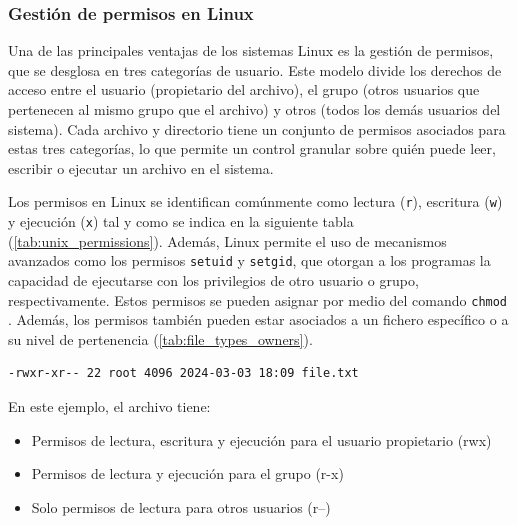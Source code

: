 
\subsubsection*{Gestión de permisos en Linux}

Una de las principales ventajas de los sistemas Linux es la gestión de permisos, que se desglosa en tres categorías de usuario. Este modelo divide los derechos de acceso entre el usuario (propietario del archivo), el grupo (otros usuarios que pertenecen al mismo grupo que el archivo) y otros (todos los demás usuarios del sistema). Cada archivo y directorio tiene un conjunto de permisos asociados para estas tres categorías, lo que permite un control granular sobre quién puede leer, escribir o ejecutar un archivo en el sistema.

Los permisos en Linux se identifican comúnmente como lectura (\texttt{r}), escritura (\texttt{w}) y ejecución (\texttt{x}) tal y como se indica en la siguiente tabla (\ref{tab:unix_permissions}). Además, Linux permite el uso de mecanismos avanzados como los permisos \texttt{setuid} y \texttt{setgid}, que otorgan a los programas la capacidad de ejecutarse con los privilegios de otro usuario o grupo, respectivamente. Estos permisos se pueden asignar por medio del comando \texttt{chmod} \cite{chmod-quickref}. Además, los permisos también pueden estar asociados a un fichero específico o a su nivel de pertenencia (\ref{tab:file_types_owners}).

\begin{center}
    \begin{mdframed}
    \scriptsize
            \begin{verbatim}
-rwxr-xr-- 22 root 4096 2024-03-03 18:09 file.txt
            \end{verbatim}
    \end{mdframed}
\end{center}

En este ejemplo, el archivo tiene:
\begin{itemize}
    \item Permisos de lectura, escritura y ejecución para el usuario propietario (rwx)
    \item Permisos de lectura y ejecución para el grupo (r-x)
    \item Solo permisos de lectura para otros usuarios (r--)
\end{itemize}

